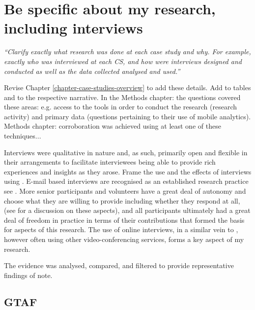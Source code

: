 \section{Be specific about my research, including interviews}
\emph{``Clarify exactly what research was done at each case study and why. For example, exactly who was interviewed at each CS, and how were interviews designed and conducted as well as the data collected analysed and used.''}

Revise Chapter \ref{chapter-case-studies-overview} to add these details. Add to tables and to the respective narrative. In the Methods chapter: the questions covered these areas: e.g. access to the tools in order to conduct the research (research activity) and primary data (questions pertaining to their use  of mobile analytics). Methods chapter: corroboration was achieved using at least one of these techniques...

Interviews were qualitative in nature and, as such, primarily open and flexible in their arrangements to facilitate interviewees being able to provide rich experiences and insights as they arose. Frame the use and the effects of interviews using . E-mail based interviews are recognised as an established research practice see . More senior participants and volunteers have a great deal of autonomy and choose what they are willing to provide including whether they respond at all, (see  for a discussion on these aspects), and all participants ultimately had a great deal of freedom in practice in terms of their contributions that formed the basis for aspects of this research. The use of online interviews, in a similar vein to , however often using other video-conferencing services, forms a key aspect of my research.

The evidence was analysed, compared, and filtered to provide representative findings of note. 

\subsection{GTAF}

